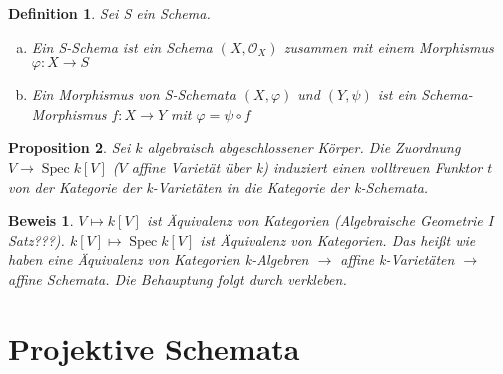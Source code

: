 \documentclass[a4paper,oneside]{scrbook}
\theoremstyle{break}
\newtheorem{Def}{Definition}[section]
\newtheorem{Prop}[Def]{Proposition}
\theoremstyle{nonumberbreak}
\theoremstyle{nonumberplain}
\newtheorem{Bew}{Beweis}
\theoremstyle{break}
\newcommand{\Spec}{%
	\ensuremath{\operatorname{Spec}}%
}
\begin{document}
\begin{Def}
	Sei S ein Schema.
	\begin{enumerate}[(a)]
		\item Ein S-Schema ist ein Schema $(X,\mathcal{O}_X)$ zusammen mit einem Morphismus $\varphi: X \rightarrow S$
		\item Ein Morphismus von S-Schemata $(X,\varphi)$ und $(Y,\psi)$ ist ein Schema-Morphismus $f: X  \rightarrow Y$ mit $\varphi = \psi \circ f$
\begin{center}
	\end{center}

	\end{enumerate}
\end{Def}

\begin{Prop}
	\label{faithful_functor_k-variety_k-scheme}
	Sei $k$ algebraisch abgeschlossener Körper. Die Zuordnung $V \rightarrow \Spec k[V]$ ($V$ affine Varietät über k) induziert einen volltreuen Funktor $t$ von der Kategorie der k-Varietäten in die Kategorie der k-Schemata.
\end{Prop}
\begin{Bew}
	$V \mapsto k[V]$ ist Äquivalenz von Kategorien (Algebraische Geometrie I Satz???). $k[V] \mapsto \Spec k[V]$ ist Äquivalenz von Kategorien. Das heißt wie haben eine Äquivalenz von Kategorien k-Algebren $\rightarrow$ affine k-Varietäten $\rightarrow$ affine Schemata. Die Behauptung folgt durch verkleben.
\end{Bew}

\section{Projektive Schemata}
\end{document}
